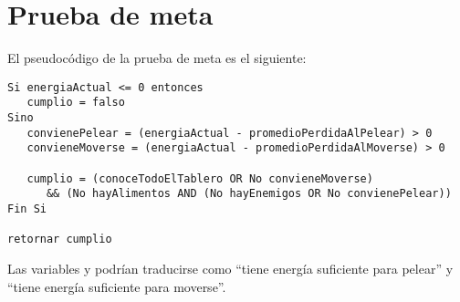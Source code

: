 \section{Prueba de meta}

El pseudocódigo de la prueba de meta es el siguiente:

\begin{verbatim}
Si energiaActual <= 0 entonces
   cumplio = falso
Sino
   convienePelear = (energiaActual - promedioPerdidaAlPelear) > 0
   convieneMoverse = (energiaActual - promedioPerdidaAlMoverse) > 0

   cumplio = (conoceTodoElTablero OR No convieneMoverse)
      && (No hayAlimentos AND (No hayEnemigos OR No convienePelear))
Fin Si

retornar cumplio
\end{verbatim}

Las variables  y  podrían
traducirse como ``tiene energía suficiente para pelear'' y ``tiene energía
suficiente para moverse''.

